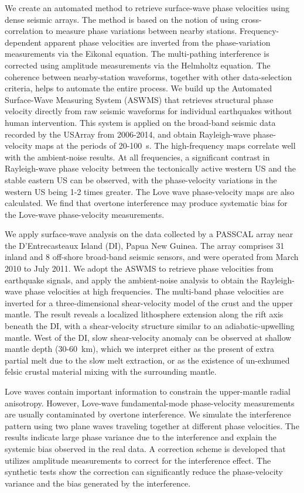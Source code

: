 We create an automated method to retrieve surface-wave phase velocities using dense seismic arrays. The method is based on the notion of using cross-correlation to measure phase variations between nearby stations. Frequency-dependent apparent phase velocities are inverted from the phase-variation measurements via the Eikonal equation. The multi-pathing interference is corrected using amplitude measurements via the Helmholtz equation. The coherence between nearby-station waveforms, together with other data-selection criteria, helps to automate the entire process. We build up the Automated Surface-Wave Measuring System (ASWMS) that retrieves structural phase velocity directly from raw seismic waveforms for individual earthquakes without human intervention. 
This system is applied on the broad-band seismic data recorded by the USArray from 2006-2014, and obtain Rayleigh-wave phase-velocity maps at the periods of 20-100~s. The high-frequency maps correlate well with the ambient-noise results. At all frequencies, a significant contrast in Rayleigh-wave phase velocity between the tectonically active western US and the stable eastern US can be observed, with the phase-velocity variations in the western US being 1-2 times greater.
The Love wave phase-velocity maps are also calculated. We find that overtone interference may produce systematic bias for the Love-wave phase-velocity measurements.

We apply surface-wave analysis on the data collected by a PASSCAL array near the D'Entrecasteaux Island (DI), Papua New Guinea. The array comprises 31 inland and 8 off-shore broad-band seismic sensors, and were operated from March 2010 to July 2011. 
We adopt the ASWMS to retrieve phase velocities from earthquake signals, and apply the ambient-noise analysis to obtain the Rayleigh-wave phase velocities at high frequencies. The multi-band phase velocities are inverted for a three-dimensional shear-velocity model of the crust and the upper mantle. The result reveals a localized lithosphere extension along the rift axis beneath the DI, with a shear-velocity structure similar to an adiabatic-upwelling mantle. West of the DI, slow shear-velocity anomaly can be observed at shallow mantle depth (30-60~km), which we interpret either as the present of extra partial melt due to the slow melt extraction, or as the existence of un-exhumed felsic crustal material mixing with the surrounding mantle.

Love waves contain important information to constrain the upper-mantle radial anisotropy. However, Love-wave fundamental-mode phase-velocity measurements are usually contaminated by overtone interference.
We simulate the interference pattern using two plane waves traveling together at different phase velocities. The results indicate large phase variance due to the interference and explain the systemic bias observed in the real data. 
A correction scheme is developed that utilizes amplitude measurements to correct for the interference effect. The synthetic tests show the correction can significantly reduce the phase-velocity variance and the bias generated by the interference.


